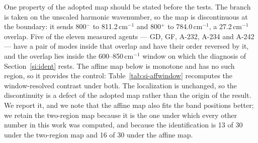\documentclass[11pt]{article}
\newcommand*\wn{\ensuremath{\text{cm}^{-1}}}
\begin{document}
One property of the adopted map should be stated before the tests. The branch is taken on
the unscaled harmonic wavenumber, so the map is discontinuous at the boundary: it sends
800$^-$ to 811.2\,\wn{} and 800$^+$ to 784.0\,\wn{}, a 27.2\,\wn{} overlap. Five of the eleven
measured agents --- GD, GF, A-232, A-234 and A-242 --- have a pair of modes inside that
overlap and have their order reversed by it, and the overlap lies inside the 600--850\,\wn{} window on which
the diagnosis of Section~\ref{si:ident} rests. The affine map below is monotone and has no
such region, so it provides the control: Table~\ref{tab:si-affwindow} recomputes the
window-resolved contrast under both. The localization is unchanged, so the discontinuity is
a defect of the adopted map rather than the origin of the result. We report it, and we note
that the affine map also fits the band positions better; we retain the two-region map
because it is the one under which every other number in this work was computed, and because
the identification is 13 of 30 under the two-region map and 16 of 30 under the affine map.
\end{document}
